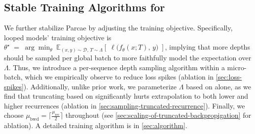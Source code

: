 \subsection{Stable Training Algorithms for \sysname}
\label{sec:rfm-training}


We further stabilize Parcae by adjusting the training objective. Specifically, looped models' training objective is
$\theta^\star \;=\; \arg\min_{\theta}\; \mathbb{E}_{(x,y)\sim \mathcal{D},\,T\sim \Lambda}\!\left[\;\ell\!\big(f_{\theta}(x;T),\, y\big)\;\right]$, implying that more depths should be sampled per global batch to more faithfully model the expectation over $\Lambda$.
Thus, we introduce a per-sequence depth sampling algorithm within a micro-batch, which we empirically observe to reduce loss spikes (ablation in \cref{sec:loss-spikes}).
Additionally, unlike prior work, we parameterize $\Lambda$ based on \meanrecurrence alone, as we find that truncating based on \meanbackward significantly hurts extrapolation to both lower and higher recurrences (ablation in \cref{sec:sampling-truncated-recurrence}).
Finally, we choose $\mu_{\text{bwd}} = \lceil \frac{\mu_{\text{rec}}}{2} \rceil$ throughout (see \cref{sec:scaling-of-truncated-backpropigation} for ablation). 
A detailed training algorithm is in \cref{sec:algorithm}. 

